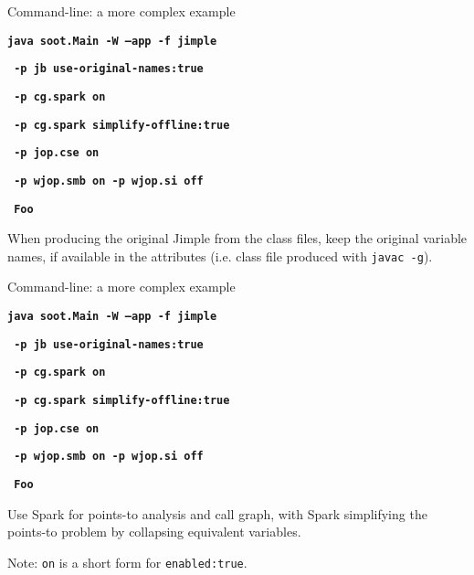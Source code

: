 \begin{slide}{Command-line: a more complex example}

\begin{small}
\textbf{\texttt{java soot.Main -W --app -f jimple}}

\textbf{\red\texttt{     -p jb use-original-names:true }}

\textbf{\texttt{     -p cg.spark on }}

\textbf{\texttt{     -p cg.spark simplify-offline:true}}

\textbf{\texttt{     -p jop.cse on   }}

\textbf{\texttt{     -p wjop.smb on -p wjop.si off }}

\textbf{\texttt{     Foo }}
\end{small}

\vspace{.2in}

When producing
the original Jimple from the class files, 
keep the original variable names, if available in the 
attributes (i.e. class file produced with \texttt{javac -g}).

\end{slide}


\begin{slide}{Command-line: a more complex example}

\begin{small}
\textbf{\texttt{java soot.Main -W --app  -f jimple}}

\textbf{\texttt{     -p jb use-original-names:true }}

\textbf{\red\texttt{     -p cg.spark on }}

\textbf{\red\texttt{     -p cg.spark simplify-offline:true}}

\textbf{\texttt{     -p jop.cse on   }}

\textbf{\texttt{     -p wjop.smb on  -p wjop.si off}}

\textbf{\texttt{     Foo }}
\end{small}

\vspace{.2in}

Use Spark for points-to analysis and
call graph,  with Spark simplifying the points-to problem by collapsing
equivalent variables.  

Note: \texttt{on} is a short form for \texttt{enabled:true}.

\end{slide}


